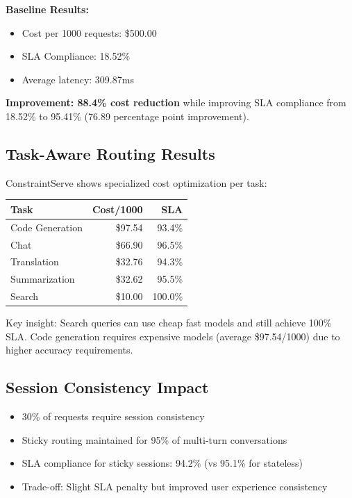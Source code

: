 \documentclass[11pt]{article}
\begin{document}
\textbf{Baseline Results:}
\begin{itemize}
    \item Cost per 1000 requests: \$500.00
    \item SLA Compliance: 18.52\%
    \item Average latency: 309.87ms
\end{itemize}

\textbf{Improvement: 88.4\% cost reduction} while improving SLA compliance from 18.52\% to 95.41\% (76.89 percentage point improvement).

\subsection{Task-Aware Routing Results}

ConstraintServe shows specialized cost optimization per task:

\begin{table}[h]
\centering
\begin{tabular}{lrr}
\toprule
\textbf{Task} & \textbf{Cost/1000} & \textbf{SLA} \\
\midrule
Code Generation & \$97.54 & 93.4\% \\
Chat & \$66.90 & 96.5\% \\
Translation & \$32.76 & 94.3\% \\
Summarization & \$32.62 & 95.5\% \\
Search & \$10.00 & 100.0\% \\
\bottomrule
\end{tabular}
\end{table}

Key insight: Search queries can use cheap fast models and still achieve 100\% SLA. Code generation requires expensive models (average \$97.54/1000) due to higher accuracy requirements.

\subsection{Session Consistency Impact}

\begin{itemize}
    \item 30\% of requests require session consistency
    \item Sticky routing maintained for 95\% of multi-turn conversations
    \item SLA compliance for sticky sessions: 94.2\% (vs 95.1\% for stateless)
    \item Trade-off: Slight SLA penalty but improved user experience consistency
\end{itemize}
\end{document}
